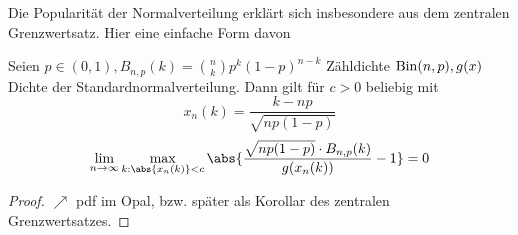 Die Popularität der Normalverteilung erklärt sich insbesondere aus dem zentralen Grenzwertsatz. Hier eine einfache Form davon
\begin{proposition}
	Seien $p \in (0,1), B_{n,p}(k) = \binom{n}{k}p^k(1-p)^{n-k}$ Zähldichte $\operatorname{Bin}(n,p), g(x)$ Dichte der Standardnormalverteilung. Dann gilt für $c>0$ beliebig mit
	\[
		x_n(k) = \frac{k-np}{\sqrt{np(1-p)}}
	\]
	\begin{align*}
		\lim_{n\to \infty} \max_{k:\abs{x_n(k)} < c} \abs{\frac{\sqrt{np(1-p)}\cdot B_{n,p}(k)}{g(x_n(k))} -1} = 0
	\end{align*}
\end{proposition}
\begin{proof}
	$\nearrow$ pdf im Opal, bzw. später als Korollar des zentralen Grenzwertsatzes.
\end{proof}